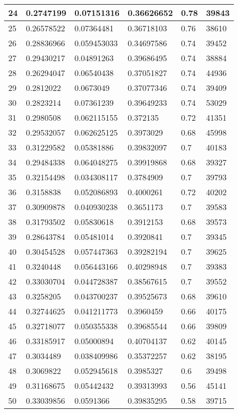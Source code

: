 \begin{longtable}{|l|l|l|l|l|l|}
24 & 0.2747199 & 0.07151316 & 0.36626652 & 0.78 & 39843 \\ \hline 
25 & 0.26578522 & 0.07364481 & 0.36718103 & 0.76 & 38610 \\ \hline 
26 & 0.28836966 & 0.059453033 & 0.34697586 & 0.74 & 39452 \\ \hline 
27 & 0.29430217 & 0.04891263 & 0.39686495 & 0.74 & 38884 \\ \hline 
28 & 0.26294047 & 0.06540438 & 0.37051827 & 0.74 & 44936 \\ \hline 
29 & 0.2812022 & 0.0673049 & 0.37077346 & 0.74 & 39409 \\ \hline 
30 & 0.2823214 & 0.07361239 & 0.39649233 & 0.74 & 53029 \\ \hline 
31 & 0.2980508 & 0.062115155 & 0.372135 & 0.72 & 41351 \\ \hline 
32 & 0.29532057 & 0.062625125 & 0.3973029 & 0.68 & 45998 \\ \hline 
33 & 0.31229582 & 0.05381886 & 0.39832097 & 0.7 & 40183 \\ \hline 
34 & 0.29484338 & 0.064048275 & 0.39919868 & 0.68 & 39327 \\ \hline 
35 & 0.32154498 & 0.034308117 & 0.3784909 & 0.7 & 39793 \\ \hline 
36 & 0.3158838 & 0.052086893 & 0.4000261 & 0.72 & 40202 \\ \hline 
37 & 0.30909878 & 0.040930238 & 0.3651173 & 0.7 & 39583 \\ \hline 
38 & 0.31793502 & 0.05830618 & 0.3912153 & 0.68 & 39573 \\ \hline 
39 & 0.28643784 & 0.05481014 & 0.3920841 & 0.7 & 39345 \\ \hline 
40 & 0.30454528 & 0.057447363 & 0.39282194 & 0.7 & 39625 \\ \hline 
41 & 0.3240448 & 0.056443166 & 0.40298948 & 0.7 & 39383 \\ \hline 
42 & 0.33030704 & 0.044728387 & 0.38567615 & 0.7 & 39552 \\ \hline 
43 & 0.3258205 & 0.043700237 & 0.39525673 & 0.68 & 39610 \\ \hline 
44 & 0.32744625 & 0.041211773 & 0.3960459 & 0.66 & 40175 \\ \hline 
45 & 0.32718077 & 0.050355338 & 0.39685544 & 0.66 & 39809 \\ \hline 
46 & 0.33185917 & 0.05000894 & 0.40704137 & 0.62 & 40145 \\ \hline 
47 & 0.3034489 & 0.038409986 & 0.35372257 & 0.62 & 38195 \\ \hline 
48 & 0.3069822 & 0.052945618 & 0.3985327 & 0.6 & 39498 \\ \hline 
49 & 0.31168675 & 0.05442432 & 0.39313993 & 0.56 & 45141 \\ \hline 
50 & 0.33039856 & 0.0591366 & 0.39835295 & 0.58 & 39715 \\ \hline 
\end{longtable}